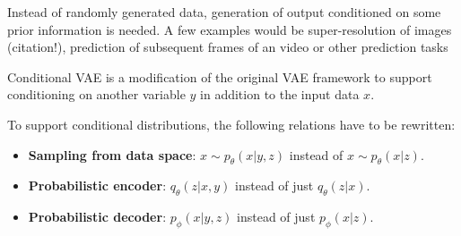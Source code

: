 Instead of randomly generated data, generation of output conditioned on some prior information is needed.
A few examples would be super-resolution of images (citation!), prediction of subsequent frames of an video or other prediction tasks

Conditional VAE is a modification of the original VAE framework to support conditioning on another variable $y$ in addition to the input data $x$.

To support conditional distributions, the following relations have to be rewritten:
\begin{itemize}
\item \textbf{Sampling from data space}: $x \sim p_\theta(x|y,z)$ instead of $x \sim p_\theta(x|z)$.\\
\item \textbf{Probabilistic encoder}: $q_\theta(z|x,y)$ instead of just $q_\theta(z|x)$.\\
\item \textbf{Probabilistic decoder}: $p_\phi(x|y,z)$ instead of just $p_\phi(x|z)$.\\
\end{itemize}
